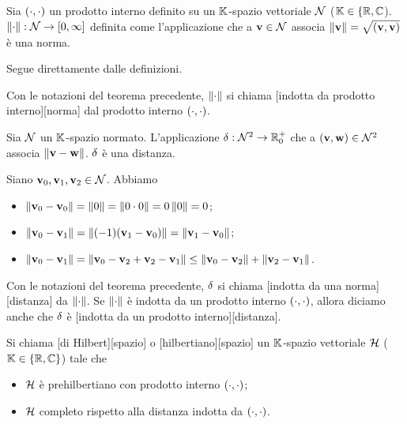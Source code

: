 \begin{Theorem}
	Sia $\left ( \cdot , \cdot \right )$ un prodotto interno definito su un
  $\mathbb{K}$-spazio vettoriale $\mathcal{N}$
  ($\mathbb{K} \in \lbrace \mathbb{R}, \mathbb{C}$).
  $\Norm{\cdot}: \NormedSpace \rightarrow [0,\infty]$ definita come
  l'applicazione che a $\mathbf{v} \in \mathcal{N}$ associa
  $\Norm{\Vector} = \sqrt{\InnerProduct{\Vector}{\Vector}}$ \`e una norma.
\end{Theorem}
\Proof Segue direttamente dalle definizioni. \EndProof
\begin{Definition}
	Con le notazioni del teorema precedente, $\Norm{\cdot}$ si chiama
  [indotta da prodotto interno][norma]
  dal prodotto interno $\left ( \cdot , \cdot \right )$.
\end{Definition}
\begin{Theorem}
	Sia $\mathcal{N}$ un $\mathbb{K}$-spazio normato.
  L'applicazione
  $\delta: \mathcal{N}^2 \rightarrow \mathbb{R}^+_0$ che a
  $(\mathbf{v},\mathbf{w}) \in \mathcal{N}^2$ associa
  $\Norm{\Vector - \VarVector}$.
  $\delta$ \`e una distanza.
\end{Theorem}
\Proof Siano $\mathbf{v}_0, \mathbf{v}_1, \mathbf{v}_2 \in \mathcal{N}$. Abbiamo
\begin{itemize}
	\item $\Norm{\Vector_0 - \Vector_0}
          = \Norm{0} = \Norm{0 \cdot 0} = 0\Norm{0} = 0$;
	\item $\Norm{\Vector_0 - \Vector_1}
          = \Norm{(-1)(\Vector_1 - \Vector_0)} = \Norm{\Vector_1 - \Vector_0}$;
	\item $\Norm{\Vector_0 - \Vector_1}
          = \Norm{\Vector_0 - \Vector_2 + \Vector_2 - \Vector_1}
          \leq \Norm{\Vector_0 - \Vector_2} + \Norm{\Vector_2 - \Vector_1}$.
\EndProof
\end{itemize}
\begin{Definition}
	Con le notazioni del teorema precedente, $\delta$ si chiama
  [indotta da una norma][distanza] da $\Norm{\cdot}$.
  Se $\Norm{\cdot}$ \`e indotta da un prodotto interno
  $\left ( \cdot , \cdot \right )$, allora diciamo anche che $\delta$ \`e
  [indotta da un prodotto interno][distanza].
\end{Definition}
\begin{Definition}
  Si chiama
  [di Hilbert][spazio] o
  [hilbertiano][spazio]
  un $\mathbb{K}$-spazio vettoriale $\mathcal{H}$
  ($\mathbb{K} \in \lbrace \mathbb{R}, \mathbb{C} \rbrace$)
  tale che
  \begin{itemize}
    \item $\mathcal{H}$ \`e prehilbertiano con prodotto interno
          $\left ( \cdot , \cdot \right )$;
    \item $\mathcal{H}$ completo rispetto alla distanza indotta da
          $\left ( \cdot , \cdot \right )$.
  \end{itemize}
\end{Definition}
